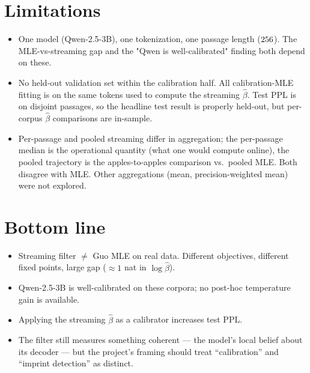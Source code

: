 \documentclass[11pt]{article}
\begin{document}
\section{Limitations}

\begin{itemize}
\item One model (Qwen-2.5-3B), one tokenization, one passage length
($256$).  The MLE-vs-streaming gap and the "Qwen is well-calibrated"
finding both depend on these.
\item No held-out validation set within the calibration half.  All
calibration-MLE fitting is on the same tokens used to compute the streaming
$\hat\beta$.  Test PPL is on disjoint passages, so the headline test result
is properly held-out, but per-corpus $\hat\beta$ comparisons are in-sample.
\item Per-passage and pooled streaming differ in aggregation; the per-passage
median is the operational quantity (what one would compute online), the
pooled trajectory is the apples-to-apples comparison vs.\ pooled MLE.  Both
disagree with MLE.  Other aggregations (mean, precision-weighted mean) were
not explored.
\end{itemize}

\section{Bottom line}

\begin{itemize}
\item Streaming filter $\neq$ Guo MLE on real data.  Different objectives,
different fixed points, large gap ($\approx 1$ nat in $\log\hat\beta$).
\item Qwen-2.5-3B is well-calibrated on these corpora; no post-hoc
temperature gain is available.
\item Applying the streaming $\hat\beta$ as a calibrator increases test PPL.
\item The filter still measures something coherent --- the model's local
belief about its decoder --- but the project's framing should treat
``calibration'' and ``imprint detection'' as distinct.
\end{itemize}
\end{document}
